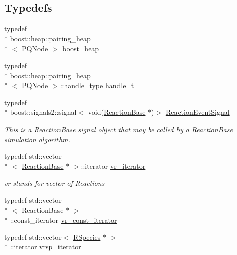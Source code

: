 \subsection*{Typedefs}
\begin{DoxyCompactItemize}
\item 
typedef \\*
boost\-::heap\-::pairing\-\_\-heap\\*
$<$ \hyperlink{classchem_1_1PQNode}{P\-Q\-Node} $>$ \hyperlink{namespacechem_aacd1d2bb93e0bb1b1af9bb1fbb5133ca}{boost\-\_\-heap}
\item 
typedef \\*
boost\-::heap\-::pairing\-\_\-heap\\*
$<$ \hyperlink{classchem_1_1PQNode}{P\-Q\-Node} $>$\-::handle\-\_\-type \hyperlink{namespacechem_a33be80d87771bff54f5cede2e5d81cd1}{handle\-\_\-t}
\item 
typedef \\*
boost\-::signals2\-::signal$<$ void(\hyperlink{classchem_1_1ReactionBase}{Reaction\-Base} $\ast$)$>$ \hyperlink{namespacechem_a40bfcc5c8ae87e2713c68fae68215991}{Reaction\-Event\-Signal}
\begin{DoxyCompactList}\small\item\em This is a \hyperlink{classchem_1_1ReactionBase}{Reaction\-Base} signal object that may be called by a \hyperlink{classchem_1_1ReactionBase}{Reaction\-Base} simulation algorithm. \end{DoxyCompactList}\item 
typedef std\-::vector\\*
$<$ \hyperlink{classchem_1_1ReactionBase}{Reaction\-Base} $\ast$ $>$\-::iterator \hyperlink{namespacechem_a0decff3bb0047ac3a45bc12163f063e4}{vr\-\_\-iterator}
\begin{DoxyCompactList}\small\item\em vr stands for vector of Reactions \end{DoxyCompactList}\item 
typedef std\-::vector\\*
$<$ \hyperlink{classchem_1_1ReactionBase}{Reaction\-Base} $\ast$ $>$\\*
\-::const\-\_\-iterator \hyperlink{namespacechem_a37ac14ea0688e0f1bc93f320f1240a74}{vr\-\_\-const\-\_\-iterator}
\item 
typedef std\-::vector$<$ \hyperlink{classchem_1_1RSpecies}{R\-Species} $\ast$ $>$\\*
\-::iterator \hyperlink{namespacechem_a9b02b32d43473a3cd87fd30f910cc121}{vrsp\-\_\-iterator}

\end{DoxyCompactItemize}
